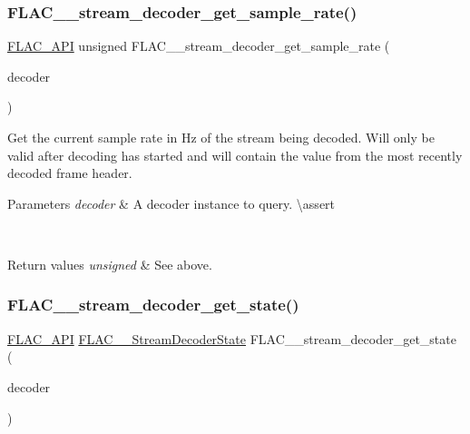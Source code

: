 \subsubsection{\texorpdfstring{FLAC\_\_stream\_decoder\_get\_sample\_rate()}{FLAC\_\_stream\_decoder\_get\_sample\_rate()}}
{\footnotesize\ttfamily \mbox{\hyperlink{group__flac__export_ga56ca07df8a23310707732b1c0007d6f5}{F\+L\+A\+C\+\_\+\+A\+PI}} unsigned F\+L\+A\+C\+\_\+\+\_\+stream\+\_\+decoder\+\_\+get\+\_\+sample\+\_\+rate (\begin{DoxyParamCaption}\item[{const \mbox{\hyperlink{struct_f_l_a_c_____stream_decoder}{F\+L\+A\+C\+\_\+\+\_\+\+Stream\+Decoder}} $\ast$}]{decoder }\end{DoxyParamCaption})}

Get the current sample rate in Hz of the stream being decoded. Will only be valid after decoding has started and will contain the value from the most recently decoded frame header.


\begin{DoxyParams}{Parameters}
{\em decoder} & A decoder instance to query. \textbackslash{}assert 
\begin{DoxyCode}{1}
\end{DoxyCode}
 \\
\hline
\end{DoxyParams}

\begin{DoxyRetVals}{Return values}
{\em unsigned} & See above. \\
\hline
\end{DoxyRetVals}
\mbox{\label{group__flac__stream__decoder_ga5899c204ad7183ec04e41855090c0635}} 
\subsubsection{\texorpdfstring{FLAC\_\_stream\_decoder\_get\_state()}{FLAC\_\_stream\_decoder\_get\_state()}}
{\footnotesize\ttfamily \mbox{\hyperlink{group__flac__export_ga56ca07df8a23310707732b1c0007d6f5}{F\+L\+A\+C\+\_\+\+A\+PI}} \mbox{\hyperlink{group__flac__stream__decoder_ga3adb6891c5871a87cd5bbae6c770ba2d}{F\+L\+A\+C\+\_\+\+\_\+\+Stream\+Decoder\+State}} F\+L\+A\+C\+\_\+\+\_\+stream\+\_\+decoder\+\_\+get\+\_\+state (\begin{DoxyParamCaption}\item[{const \mbox{\hyperlink{struct_f_l_a_c_____stream_decoder}{F\+L\+A\+C\+\_\+\+\_\+\+Stream\+Decoder}} $\ast$}]{decoder }\end{DoxyParamCaption})}

